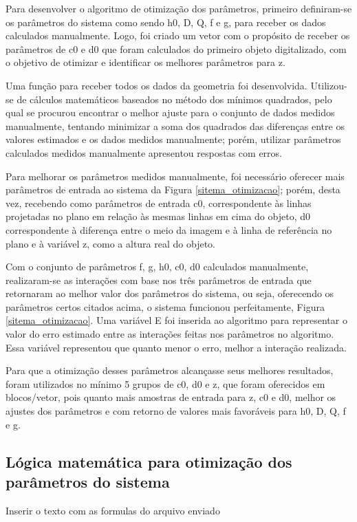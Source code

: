 \documentclass[a4paper, 12pt]{article}
\begin{document}
Para desenvolver o algoritmo de otimização dos parâmetros, primeiro definiram-se os parâmetros do sistema como sendo h0, D, Q, f e g, para receber os dados calculados manualmente. Logo, foi criado um vetor com o propósito de receber os parâmetros de c0 e d0 que foram calculados do primeiro objeto digitalizado, com o objetivo de otimizar e identificar os melhores parâmetros para z.

Uma função para receber todos os dados da geometria foi desenvolvida. Utilizou-se de cálculos matemáticos baseados no método dos mínimos quadrados, pelo qual se procurou encontrar o melhor ajuste para o conjunto de dados medidos manualmente, tentando minimizar a soma dos quadrados das diferenças entre os valores estimados e os dados medidos manualmente; porém, utilizar parâmetros calculados medidos manualmente apresentou respostas com erros.

Para melhorar os parâmetros medidos manualmente, foi necessário oferecer mais parâmetros de entrada ao sistema da Figura \ref{sitema_otimizacao}; porém, desta vez, recebendo como parâmetros de entrada c0, correspondente às linhas projetadas no plano em relação às mesmas linhas em cima do objeto, d0 correspondente à diferença entre o meio da imagem e à linha de referência no plano e à variável z, como a altura real do objeto.

Com o conjunto de parâmetros f, g, h0, c0, d0 calculados manualmente, realizaram-se as interações com base nos três parâmetros de entrada que retornaram ao melhor valor dos parâmetros do sistema, ou seja, oferecendo os parâmetros certos citados acima, o sistema funcionou perfeitamente, Figura \ref{sitema_otimizacao}. Uma variável E foi inserida ao algoritmo para representar o valor do erro estimado entre as interações feitas nos parâmetros no algoritmo. Essa variável representou que quanto menor o erro, melhor a interação realizada.

Para que a otimização desses parâmetros alcançasse seus melhores resultados, foram utilizados no mínimo 5 grupos de c0, d0 e z, que foram oferecidos em blocos/vetor, pois quanto mais amostras de entrada para z, c0 e d0, melhor os ajustes dos parâmetros e com retorno de valores mais favoráveis para h0, D, Q, f e g. 

\subsection{Lógica matemática para otimização dos parâmetros do sistema}

Inserir o texto com as formulas do arquivo enviado
\end{document}
